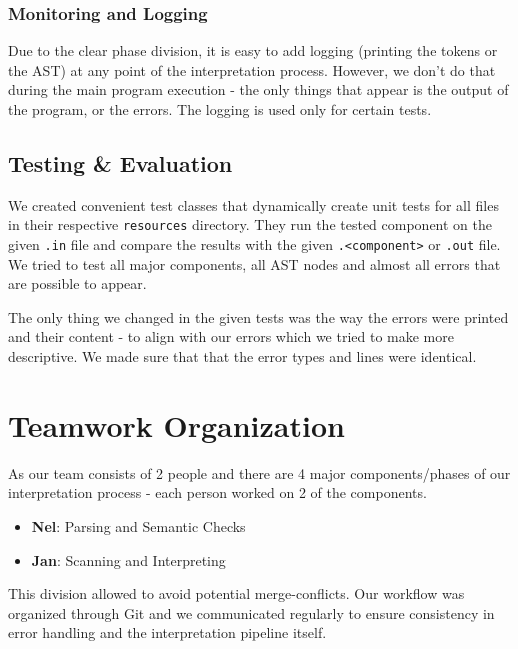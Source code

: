\documentclass[a4paper,12pt]{article}
\providecommand{\tightlist}{\setlength{\itemsep}{0pt}\setlength{\parskip}{0pt}}
\begin{document}
\subsubsection{Monitoring and Logging}\label{monitoring-and-logging}

Due to the clear phase division, it is easy to add logging (printing the
tokens or the AST) at any point of the interpretation process. However,
we don't do that during the main program execution - the only things
that appear is the output of the program, or the errors. The logging is
used only for certain tests.

\subsection{Testing \& Evaluation}\label{testing-evaluation}

We created convenient test classes that dynamically create unit tests
for all files in their respective \texttt{resources} directory. They run
the tested component on the given \texttt{.in} file and compare the
results with the given \texttt{.\textless{}component\textgreater{}} or
\texttt{.out} file. We tried to test all major components, all AST nodes
and almost all errors that are possible to appear. \newline

The only thing we changed in the given tests was the way the errors were
printed and their content - to align with our errors which we tried to
make more descriptive. We made sure that that the error types and lines
were identical.

\section{Teamwork Organization}\label{teamwork-organization}

As our team consists of 2 people and there are 4 major components/phases
of our interpretation process - each person worked on 2 of the
components.

\begin{itemize}
\tightlist
\item
  \textbf{Nel}: Parsing and Semantic Checks
\item
  \textbf{Jan}: Scanning and Interpreting
\end{itemize}

This division allowed to avoid potential merge-conflicts. Our workflow
was organized through Git and we communicated regularly to ensure
consistency in error handling and the interpretation pipeline itself.
\newline
\end{document}
